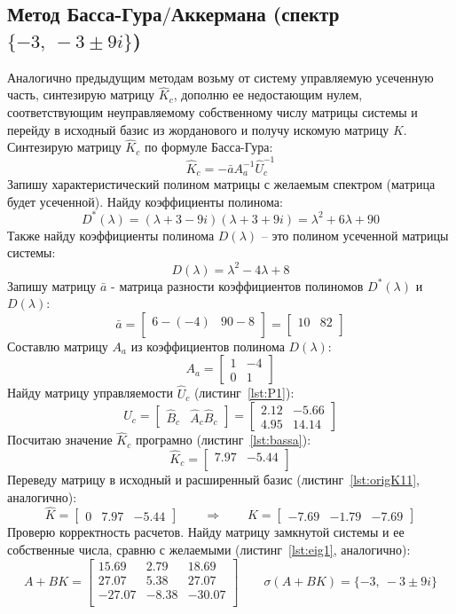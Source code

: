 \documentclass[a4paper,12pt]{article}
\begin{document}
\subsection{Метод Басса-Гура\(\mathbb{/}\)Аккермана (спектр $\{-3,\ -3 \pm 9i\}$)}
Аналогично предыдущим методам возьму от систему управляемую усеченную часть, синтезирую матрицу \(\hat K_c\), дополню ее недостающим нулем, соответствующим неуправляемому собственному числу матрицы системы и перейду в исходный базис из жорданового и получу искомую матрицу \(K\).\\
Синтезирую матрицу $\hat{K}_c$ по формуле Басса-Гура:
\[
\hat{K}_c = -\bar{a} A_a^{-1} \hat{U}_c^{-1}
\]
Запишу характеристический полином матрицы с желаемым спектром (матрица будет усеченной). Найду коэффициенты полинома:
\[
D^*(\lambda) = (\lambda + 3 - 9i)(\lambda + 3 + 9i) = \lambda^2 + 6\lambda + 90
\]
Также найду коэффициенты полинома \(D(\lambda)\) -- это полином усеченной матрицы системы:
\[
D(\lambda) = \lambda^2 -4 \lambda + 8
\]
Запишу матрицу \(\bar a\) - матрица разности коэффициентов полиномов \(D^*(\lambda)\) и \(D(\lambda)\):
\[
\bar a = \begin{bmatrix}
	6 - (-4) & 90 - 8 \\
\end{bmatrix} = \begin{bmatrix}
	10 & 82 \\
\end{bmatrix}
\]
Составлю матрицу $A_a$ из коэффициентов полинома $D(\lambda)$:
\[
A_a = \begin{bmatrix}
	1 & -4 \\
	0 & 1
\end{bmatrix}
\]
Найду матрицу управляемости $\hat{U}_c$ (листинг~\ref{lst:P1}):
\[
\hat{U}_c = \begin{bmatrix}
	\hat{B}_c & \hat{A}_c \hat{B}_c
\end{bmatrix} = \begin{bmatrix}
	2.12 & -5.66 \\
	4.95 & 14.14
\end{bmatrix}
\]
Посчитаю значение \(\hat K_c\) програмно (листинг~\ref{lst:bassa}):
\[
\hat K_c = \begin{bmatrix}
	7.97 & -5.44 \\
\end{bmatrix}
\]
Переведу матрицу в исходный и расширенный базис (листинг~\ref{lst:origK11}, аналогично):
\[
\hat K =
\begin{bmatrix}
	0 & 7.97 & -5.44
\end{bmatrix}
\qquad \Longrightarrow \qquad	
K = \begin{bmatrix} -7.69 & -1.79 & -7.69 \end{bmatrix}
\]
Проверю корректность расчетов. Найду матрицу замкнутой системы и ее собственные числа, сравню с желаемыми (листинг~\ref{lst:eig1}, аналогично):
\[
A + BK = \begin{bmatrix}
	
	15.69 & 2.79 & 18.69 \\
	27.07 & 5.38 & 27.07 \\
	-27.07 & -8.38 & -30.07 \\
\end{bmatrix} \qquad 
\sigma(A + BK) = \{-3,\ -3 \pm 9i\}
\]
\end{document}
